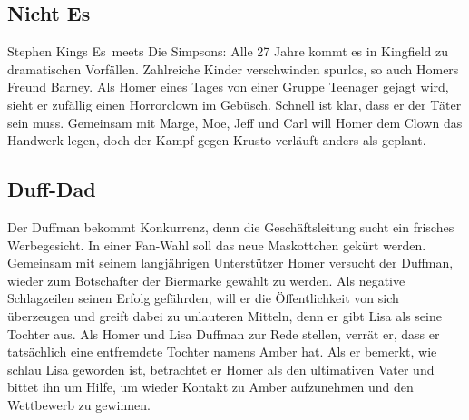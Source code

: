 
\subsection{Nicht Es}
Stephen Kings \glqq Es\grqq\ meets \glqq Die Simpsons\grqq : Alle 27 Jahre kommt es in Kingfield zu dramatischen Vorfällen. Zahlreiche Kinder verschwinden spurlos, so auch Homers Freund Barney. Als Homer eines Tages von einer Gruppe Teenager gejagt wird, sieht er zufällig einen Horrorclown im Gebüsch. Schnell ist klar, dass er der Täter sein muss. Gemeinsam mit Marge, Moe, Jeff und Carl will Homer dem Clown das Handwerk legen, doch der Kampf gegen Krusto verläuft anders als geplant.


\subsection{Duff-Dad}
Der Duffman bekommt Konkurrenz, denn die Geschäftsleitung sucht ein frisches Werbegesicht. In einer Fan-Wahl soll das neue Maskottchen gekürt werden. Gemeinsam mit seinem langjährigen Unterstützer Homer versucht der Duffman, wieder zum Botschafter der Biermarke gewählt zu werden. Als negative Schlagzeilen seinen Erfolg gefährden, will er die Öffentlichkeit von sich überzeugen und greift dabei zu unlauteren Mitteln, denn er gibt Lisa als seine Tochter aus. Als Homer und Lisa Duffman zur Rede stellen, verrät er, dass er tatsächlich eine entfremdete Tochter namens Amber hat. Als er bemerkt, wie schlau Lisa geworden ist, betrachtet er Homer als den ultimativen Vater und bittet ihn um Hilfe, um wieder Kontakt zu Amber aufzunehmen und den Wettbewerb zu gewinnen.

